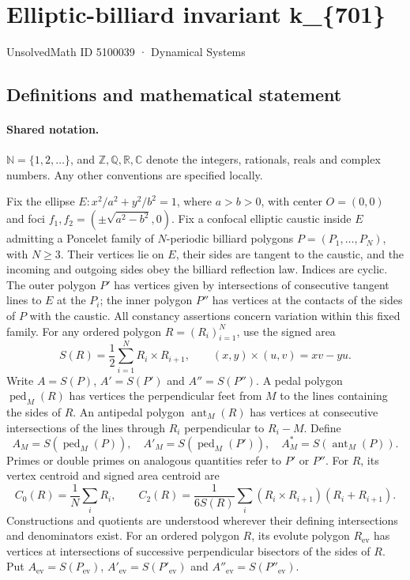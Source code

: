 \documentclass[11pt]{article}
\begin{document}
\setcounter{section}{5100038}
\section{Elliptic-billiard invariant k\_\{701\}}\label{5100039}
{\small\sffamily UnsolvedMath ID 5100039 · Dynamical Systems}
\subsection{Definitions and mathematical statement}

\paragraph{Shared notation.}$\mathbb N=\{1,2,\ldots\}$, and $\mathbb Z,\mathbb Q,\mathbb R,\mathbb C$ denote the integers, rationals, reals and complex numbers. Any other conventions are specified locally.


Fix the ellipse $E:x^2/a^2+y^2/b^2=1$, where $a>b>0$, with center $O=(0,0)$ and foci $f_1,f_2=(\pm\sqrt{a^2-b^2},0)$. Fix a confocal elliptic caustic inside $E$ admitting a Poncelet family of $N$-periodic billiard polygons $P=(P_1,\ldots,P_N)$, with $N\geq3$. Their vertices lie on $E$, their sides are tangent to the caustic, and the incoming and outgoing sides obey the billiard reflection law. Indices are cyclic. The outer polygon $P'$ has vertices given by intersections of consecutive tangent lines to $E$ at the $P_i$; the inner polygon $P''$ has vertices at the contacts of the sides of $P$ with the caustic. All constancy assertions concern variation within this fixed family.
For any ordered polygon $R=(R_i)_{i=1}^N$, use the signed area
\[S(R)=\frac12\sum_{i=1}^N R_i\times R_{i+1},\qquad (x,y)\times(u,v)=xv-yu.\]
Write $A=S(P)$, $A'=S(P')$ and $A''=S(P'')$. A pedal polygon $\operatorname{ped}_M(R)$ has vertices the perpendicular feet from $M$ to the lines containing the sides of $R$. An antipedal polygon $\operatorname{ant}_M(R)$ has vertices at consecutive intersections of the lines through $R_i$ perpendicular to $R_i-M$. Define
\[A_M=S(\operatorname{ped}_M(P)),\quad A'_M=S(\operatorname{ped}_M(P')),\quad A_M^*=S(\operatorname{ant}_M(P)).\]
Primes or double primes on analogous quantities refer to $P'$ or $P''$. For $R$, its vertex centroid and signed area centroid are
\[C_0(R)=\frac1N\sum_i R_i,\qquad C_2(R)=\frac{1}{6S(R)}\sum_i(R_i\times R_{i+1})(R_i+R_{i+1}).\]
Constructions and quotients are understood wherever their defining intersections and denominators exist.
For an ordered polygon $R$, its evolute polygon $R_{\mathrm{ev}}$ has vertices at intersections of successive perpendicular bisectors of the sides of $R$. Put $A_{\mathrm{ev}}=S(P_{\mathrm{ev}})$, $A'_{\mathrm{ev}}=S(P'_{\mathrm{ev}})$ and $A''_{\mathrm{ev}}=S(P''_{\mathrm{ev}})$.
\end{document}

